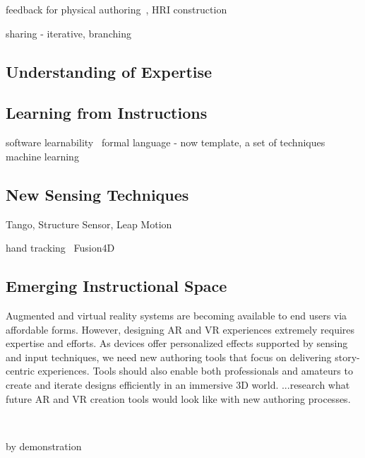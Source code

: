 feedback for physical authoring~\cite{Agrawal:2015:PPS:2807442.2807505,Zoran:2013:FFD:2470654.2481361}, HRI construction~\cite{Vasey:2016:HHR:2897839.2927404}

sharing - iterative, branching

\subsection{Understanding of Expertise}

\subsection{Learning from Instructions}

software learnability~\cite{Grossman:2009:SSL:1518701.1518803}
formal language
- now template, a set of techniques
machine learning

\subsection{New Sensing Techniques}
Tango, Structure Sensor, Leap Motion

hand tracking~\cite{taylor-siggraph2016}
Fusion4D~\cite{dou-siggraph2016}

\subsection{Emerging Instructional Space}

Augmented and virtual reality systems are becoming available to end users via affordable forms. However, designing AR and VR experiences extremely requires expertise and efforts. As devices offer personalized effects supported by sensing and input techniques, we need new authoring tools that focus on delivering story-centric experiences. Tools should also enable both professionals and amateurs to create and iterate designs efficiently in an immersive 3D world. ...research what future AR and VR creation tools would look like with new authoring processes.

~\cite{MicrosoftHoloLensSkype,Gurevich:2012ko}

by demonstration~\cite{MotionBuilderAR}

